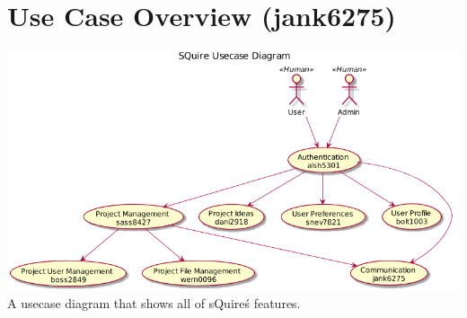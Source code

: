 \documentclass[11pt]{report}
\begin{document}
\section{Use Case Overview (jank6275)}
    \includegraphics[width=\textwidth]{diagrams/overview-jank6275}
    A usecase diagram that shows all of sQuire\'s features.
\end{document}

